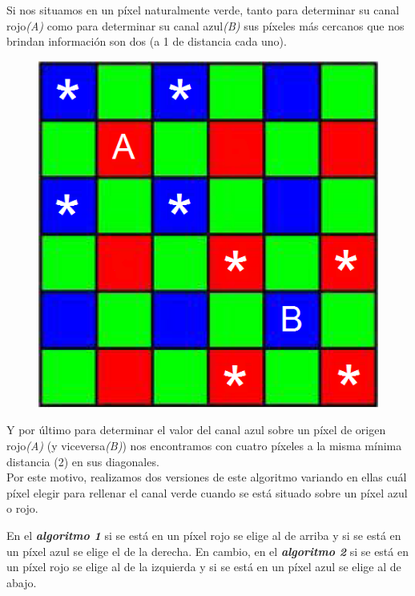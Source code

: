 \documentclass[a4paper]{article}
\begin{document}
Si nos situamos en un p\'ixel naturalmente verde, tanto para determinar su canal rojo\emph{(A)} como para determinar su canal azul\emph{(B)} sus p\'ixeles m\'as cercanos que nos brindan informaci\'on son dos (a 1 de distancia cada uno). 
\begin{figure}[h!]
	\caption{}
	\begin{center}
	\includegraphics[scale=0.36]{imagenes/vecino3}
	\label{Vecino3}
  \end{center}
\end{figure}

Y por \'ultimo para determinar el valor del canal azul sobre un p\'ixel de origen rojo\emph{(A)} (y viceversa\emph{(B)}) nos encontramos con cuatro p\'ixeles a la misma m\'inima distancia (2) en sus diagonales. \\

Por este motivo, realizamos dos versiones de este algoritmo variando en ellas cu\'al p\'ixel elegir para rellenar el canal verde cuando se est\'a situado sobre un p\'ixel azul o rojo.

En el \emph{\textbf{algoritmo 1}} si se est\'a en un p\'ixel rojo se elige al de arriba y si se est\'a en un p\'ixel azul se elige el de la derecha. En cambio, en el \emph{\textbf{algoritmo 2}} si se est\'a en un p\'ixel rojo se elige al de la izquierda y si se est\'a en un p\'ixel azul se elige al de abajo.
\end{document}
